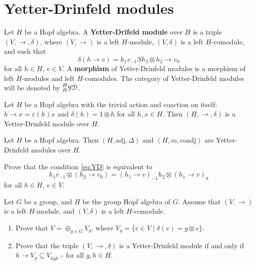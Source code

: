 \section{Yetter-Drinfeld modules}

\begin{definition}
Let $H$ be a Hopf algebra. A \textbf{Yetter-Drifeld module} over $H$ is a
triple $(V,\rightarrow,\delta)$, where $(V,\rightarrow)$ is a left $H$-module,
$(V,\delta)$ is a left $H$-comodule, and such that 
\begin{equation}
\delta(h\rightarrow v)=h_{1}v_{-1}Sh_{3}\otimes h_{2}\rightarrow v_{0}\label{eq:YD}
\end{equation}
for all $h\in H$, $v\in V$. A \textbf{morphism} of Yetter-Drinfeld modules
is a morphism of left $H$-modules and left $H$-comodules. The category of Yetter-Drinfeld
modules will be denoted by $\prescript{H}{H}{\mathcal{YD}}$.
\end{definition}

\begin{example}
Let $H$ be a Hopf algebra with the trivial action and coaction on itself:
$h\rightarrow x=\varepsilon(h)x$ and $\delta(h)=1\otimes h$ for all $h,x\in H$.
Then $(H,\rightarrow,\delta)$ is a Yetter-Drinfeld module over $H$.
\end{example}

\begin{example}
Let $H$ be a Hopf algebra. Then $(H,\mathrm{adj},\Delta)$ and
$(H,m,\mathrm{coadj})$ are Yetter-Drinfeld modules over $H$.
\end{example}

\begin{exercise}
\label{exercise:YD_condition}
Prove that the condition \eqref{eq:YD} is equivalent to
\begin{equation}
\label{eq:left_left_YD_equivalent}
h_{1}v_{-1}\otimes(h_{2}\rightarrow v_{0})=(h_{1}\rightarrow v)_{-1}h_{2}\otimes(h_{1}\rightarrow v)_{0}
\end{equation}
for all $h\in H$, $v\in V$.
\end{exercise}

\begin{exercise}
Let $G$ be a group, and $H$ be the group Hopf algebra of $G$. Assume that
$(V,\rightarrow)$ is a left $H$-module, and $(V,\delta)$ is a left
$H$-comodule. 
\begin{enumerate}
\item Prove that $V=\oplus_{g\in G}V_{g}$, where $V_{g}=\{v\in V\mid\delta(v)=g\otimes v\}$.  
\item Prove that the triple $(V,\rightarrow,\delta)$ is a Yetter-Drinfeld
module if and only if $h\rightarrow V_{g}\subseteq V_{hgh^{-1}}$ for all
$g,h\in H$.
\end{enumerate}
\end{exercise}

